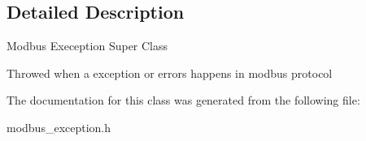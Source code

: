 \subsection{Detailed Description}
Modbus Exeception Super Class

Throwed when a exception or errors happens in modbus protocol 

The documentation for this class was generated from the following file\+:\begin{DoxyCompactItemize}
\item 
modbus\+\_\+exception.\+h\end{DoxyCompactItemize}
